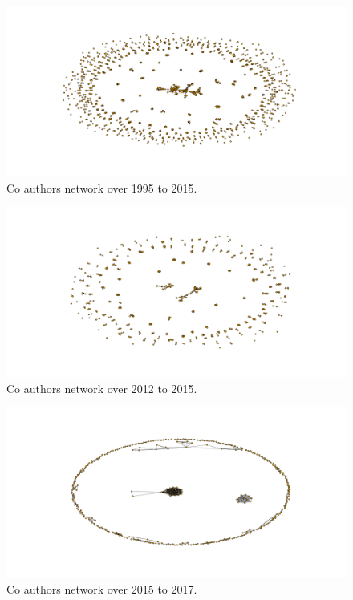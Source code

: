 \documentclass{article}
\begin{document}
\begin{figure}
    \includegraphics[width=\textwidth]{./assets/images/network_over_period_4.pdf}
    \caption{Co authors network over 1995 to 2015.}\label{fig:co_authors_1995_2015}
\end{figure}

\begin{figure}
    \includegraphics[width=\textwidth]{./assets/images/network_over_period_5.pdf}
    \caption{Co authors network over 2012 to 2015.}\label{fig:co_authors_2012_2015}
\end{figure}

\begin{figure}
    \includegraphics[width=\textwidth]{./assets/images/network_over_period_6.pdf}
    \caption{Co authors network over 2015 to 2017.}\label{fig:co_authors_2015_2017}
\end{figure}
\end{document}
